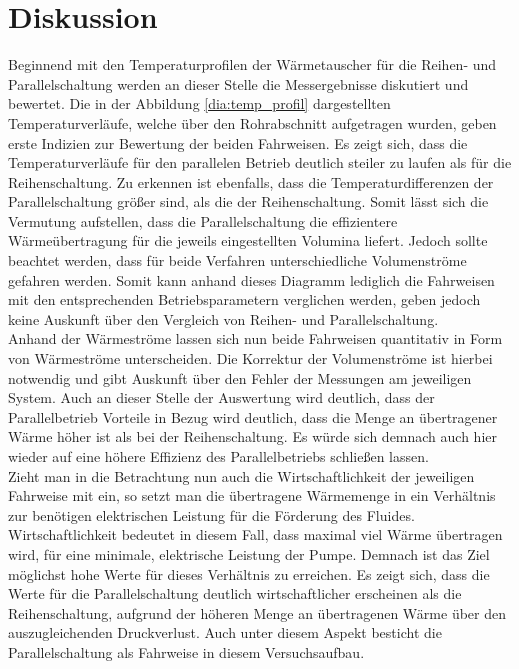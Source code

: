 \newpage
\section{Diskussion}
\label{sec:diskussion}
Beginnend mit den Temperaturprofilen der Wärmetauscher für die Reihen- und Parallelschaltung werden an dieser Stelle die Messergebnisse diskutiert und bewertet. Die in der Abbildung \ref{dia:temp_profil} dargestellten Temperaturverläufe, welche über den Rohrabschnitt aufgetragen wurden,  geben erste Indizien zur Bewertung der beiden Fahrweisen. Es zeigt sich, dass die Temperaturverläufe für den parallelen Betrieb deutlich steiler zu laufen als für die Reihenschaltung. Zu erkennen ist ebenfalls, dass die Temperaturdifferenzen der Parallelschaltung größer sind, als die der Reihenschaltung. Somit lässt sich die Vermutung aufstellen, dass die Parallelschaltung die effizientere Wärmeübertragung für die jeweils eingestellten Volumina liefert. Jedoch sollte beachtet werden, dass für beide Verfahren unterschiedliche Volumenströme gefahren werden. Somit kann anhand dieses Diagramm lediglich die Fahrweisen mit den entsprechenden Betriebsparametern verglichen werden, geben jedoch keine Auskunft über den Vergleich von Reihen- und Parallelschaltung.\\

Anhand der Wärmeströme lassen sich nun beide Fahrweisen quantitativ in Form von Wärmeströme unterscheiden. Die Korrektur der Volumenströme ist hierbei notwendig und gibt Auskunft über den Fehler der Messungen am jeweiligen System. Auch an dieser Stelle der Auswertung wird deutlich, dass der Parallelbetrieb Vorteile in Bezug  wird deutlich, dass die Menge an übertragener Wärme höher ist als bei der Reihenschaltung. Es würde sich demnach auch hier wieder auf eine höhere Effizienz des Parallelbetriebs schließen lassen.\\

Zieht man in die Betrachtung nun auch die Wirtschaftlichkeit der jeweiligen Fahrweise mit ein, so setzt man die übertragene Wärmemenge in ein Verhältnis zur benötigen elektrischen Leistung für die Förderung des Fluides. Wirtschaftlichkeit bedeutet in diesem Fall, dass maximal viel Wärme übertragen wird, für eine minimale, elektrische Leistung der Pumpe. Demnach ist das Ziel möglichst hohe Werte für dieses Verhältnis zu erreichen. Es zeigt sich, dass die Werte für die Parallelschaltung deutlich wirtschaftlicher erscheinen als die Reihenschaltung, aufgrund der höheren Menge an übertragenen Wärme über den auszugleichenden Druckverlust. Auch unter diesem Aspekt besticht die Parallelschaltung als Fahrweise in diesem Versuchsaufbau.

